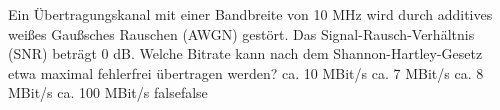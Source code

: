     {Ein Übertragungskanal mit einer Bandbreite von 10 MHz wird durch additives weißes Gaußsches Rauschen (AWGN) gestört. Das Signal-Rausch-Verhältnis (SNR) beträgt 0 dB. Welche Bitrate kann nach dem Shannon-Hartley-Gesetz etwa maximal fehlerfrei übertragen werden?}
    {ca. 10 MBit/s}
    {ca. 7 MBit/s}
    {ca. 8 MBit/s}
    {ca. 100 MBit/s}
    {false}{false}